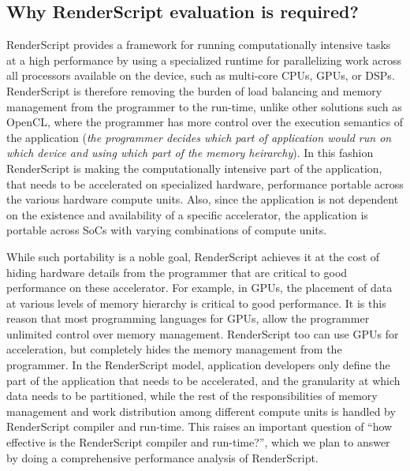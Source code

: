 \subsection{Why RenderScript evaluation is required?}
RenderScript provides a framework
for running computationally intensive tasks at a high performance by using a
specialized runtime for 
parallelizing work across all processors available on the device, such as
multi-core CPUs, GPUs, or DSPs. RenderScript is therefore removing the
burden of load balancing and memory management from the programmer to the run-time, unlike other
solutions such as OpenCL, where the programmer has more control over the
execution semantics of the application ({\em the programmer decides which part
of application would run on which device and using which part of the memory heirarchy}).
In this fashion RenderScript is
making the computationally intensive part of the application, that needs to be
accelerated on specialized hardware, performance portable across the various hardware compute
units. Also, since the application is not dependent on the existence and
availability of a specific accelerator, the application is portable across SoCs
with varying combinations of compute units.

While such portability is a noble goal, RenderScript achieves it at the cost of
hiding hardware details from the programmer that are critical to good
performance on these accelerator. For example, in GPUs, the placement of data at
various levels of memory hierarchy is critical to good performance.
It is this reason that most programming languages for GPUs, allow the programmer
unlimited control over memory management. RenderScript too can use GPUs for acceleration, but
completely hides the memory management from the programmer. In the RenderScript
model, application developers only define the part of the application that needs
to be accelerated, and the granularity at which data needs to be partitioned,
while the rest of the responsibilities of memory management and work distribution
among different compute units is handled by RenderScript compiler and run-time.
This raises an important
question of ``how effective is the RenderScript compiler and run-time?'', which
we plan to answer by doing a comprehensive performance analysis of RenderScript.

%
%
%


